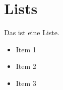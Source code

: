 \chapter{Lists}
\label{ch:lists}

Das ist eine Liste.

\begin{itemize}
	\item{Item 1}
	\item{Item 2}
	\item{Item 3}
\end{itemize}